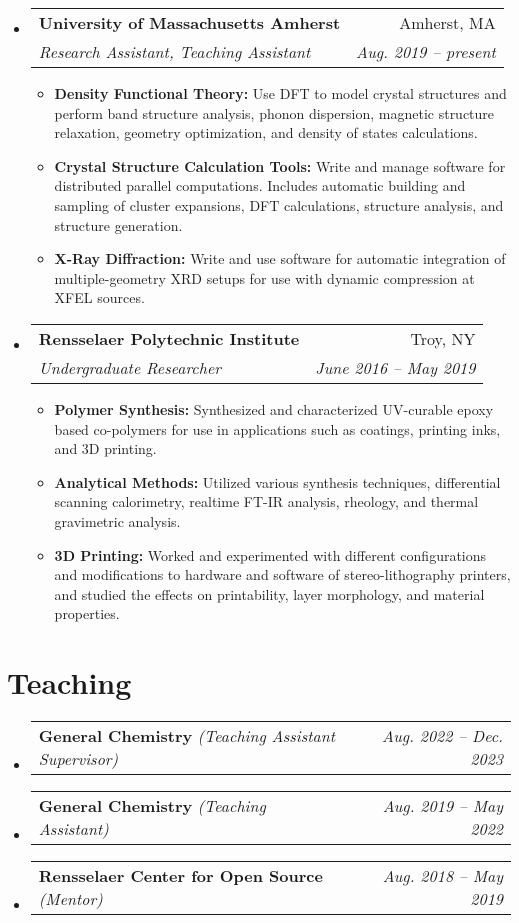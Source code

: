 \documentclass[letterpaper,11pt]{article}
\makeatletter
\newcommand{\positionItem}[4]{
    \vspace{-1pt}\item[]
    \begin{tabular*}{\textwidth}{l@{\extracolsep{\fill}}r}
        \textbf{#1} & #2 \\
        \textit{\footnotesize #3} & \textit{\footnotesize #4} \\
    \end{tabular*}\vspace{-8pt}
}
\newcommand{\positionSubItem}[2]{
    \scriptsize \item \textbf{#1} {#2 \vspace{-2pt}}
}
\newcommand{\teaching}[3]{
    \vspace{-2pt}
    \scriptsize
    \item[]
    \begin{tabularx}{\textwidth}{l@{\extracolsep{\fill}}r}
        \textbf{#1} \textit{(#2)} & \textit{#3} \\
    \end{tabularx}\vspace{-12pt}
}
\makeatother
\begin{document}
    \begin{itemize}[leftmargin=0pt]
        \positionItem
        {University of Massachusetts Amherst}{Amherst, MA}
        {Research Assistant, Teaching Assistant}{Aug. 2019 -- present}
        \begin{itemize}
            \positionSubItem{Density Functional Theory:}
                {Use DFT to model crystal structures and perform band structure analysis, phonon dispersion, magnetic structure relaxation, geometry optimization, and density of states calculations.}
            \positionSubItem{Crystal Structure Calculation Tools:}
                {Write and manage software for distributed parallel computations. Includes automatic building and sampling of cluster expansions, DFT calculations, structure analysis, and structure generation.}
            \positionSubItem{X-Ray Diffraction:}
                {Write and use software for automatic integration of multiple-geometry XRD setups for use with dynamic compression at XFEL sources.}
        \end{itemize}
    \end{itemize}
    
    \vspace{-10pt}
    
    \begin{itemize}[leftmargin=0pt]
        \positionItem
        {Rensselaer Polytechnic Institute}{Troy, NY}
        {Undergraduate Researcher}{June 2016 -- May 2019}
        \begin{itemize}
            \positionSubItem{Polymer Synthesis:}
                {Synthesized and characterized UV-curable epoxy based co-polymers for use in applications such as coatings, printing inks, and 3D printing.}
            \positionSubItem{Analytical Methods:}
                {Utilized various synthesis techniques, differential scanning calorimetry, realtime FT-IR analysis, rheology, and thermal gravimetric analysis.}
            \positionSubItem{3D Printing:}
                {Worked and experimented with different configurations and modifications to hardware and software of stereo-lithography printers, and studied the effects on printability, layer morphology, and material properties.}
        \end{itemize}
    \end{itemize}

\section{Teaching}
    \vspace{4pt}
    \begin{itemize}[leftmargin=0pt]
        \teaching{General Chemistry}{Teaching Assistant Supervisor}{Aug. 2022 -- Dec. 2023}
        \teaching{General Chemistry}{Teaching Assistant}{Aug. 2019 -- May 2022}
        \teaching{Rensselaer Center for Open Source}{Mentor}{Aug. 2018 -- May 2019}
    \end{itemize}
\end{document}
